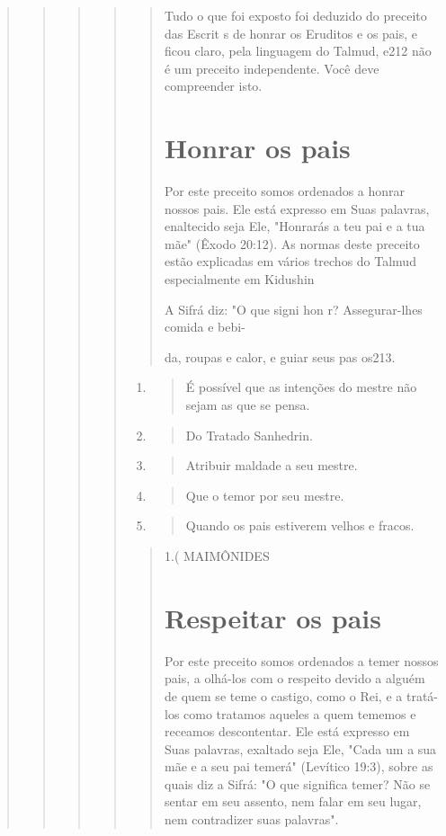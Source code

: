 \begin{quote}
\begin{quote}
\begin{quote}
\begin{quote}
\begin{quote}
Tudo o que foi exposto foi deduzido do preceito das Escrit s de honrar
os Eruditos e os pais, e ficou claro, pela linguagem do Talmud, e212 não
é um preceito independente. Você deve compreender isto.

\section{Honrar os pais}

Por este preceito somos ordenados a honrar nossos pais. Ele está
ex­presso em Suas palavras, enaltecido seja Ele, "Honrarás a teu pai e a
tua mãe" (Êxodo 20:12). As normas deste preceito estão explicadas em
vários trechos do Talmud especialmente em Kidushin

A Sifrá diz: "O que signi hon r? Assegurar-lhes comida e bebi-

da, roupas e calor, e guiar seus pas os213.
\end{quote}

\begin{enumerate}
\def\labelenumi{\arabic{enumi}.}
\setcounter{enumi}{208}
\item
 \begin{quote}
 É possível que as intenções do mestre não sejam as que se pensa.
 \end{quote}
\item
 \begin{quote}
 Do Tratado Sanhedrin.
 \end{quote}
\item
 \begin{quote}
 Atribuir maldade a seu mestre.
 \end{quote}
\item
 \begin{quote}
 Que o temor por seu mestre.
 \end{quote}
\item
 \begin{quote}
 Quando os pais estiverem velhos e fracos.
 \end{quote}
\end{enumerate}

\begin{quote}
1.( MAIMÔNIDES

\section{Respeitar os pais}

Por este preceito somos ordenados a temer nossos pais, a olhá-los com o
respeito devido a alguém de quem se teme o castigo, como o Rei, e a
tratá-los como tratamos aqueles a quem tememos e receamos descontentar.
Ele está expresso em Suas palavras, exaltado seja Ele, "Cada um a sua
mãe e a seu pai temerá" (Levítico 19:3), sobre as quais diz a Sifrá: "O
que significa temer? Não se sentar em seu assento, nem falar em seu
lugar, nem contradizer suas palavras".
\end{quote}


\end{quote}
\end{quote}
\end{quote}
\end{quote}
